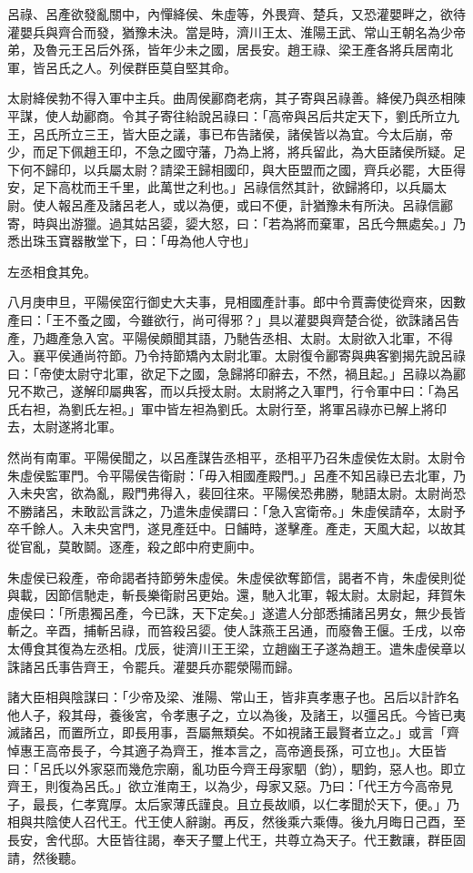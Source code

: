 \begin{pinyinscope}
呂祿、呂產欲發亂關中，內憚絳侯、朱虛等，外畏齊、楚兵，又恐灌嬰畔之，欲待灌嬰兵與齊合而發，猶豫未決。當是時，濟川王太、淮陽王武、常山王朝名為少帝弟，及魯元王呂后外孫，皆年少未之國，居長安。趙王祿、梁王產各將兵居南北軍，皆呂氏之人。列侯群臣莫自堅其命。

太尉絳侯勃不得入軍中主兵。曲周侯酈商老病，其子寄與呂祿善。絳侯乃與丞相陳平謀，使人劫酈商。令其子寄往紿說呂祿曰：「高帝與呂后共定天下，劉氏所立九王，呂氏所立三王，皆大臣之議，事已布告諸侯，諸侯皆以為宜。今太后崩，帝少，而足下佩趙王印，不急之國守藩，乃為上將，將兵留此，為大臣諸侯所疑。足下何不歸印，以兵屬太尉？請梁王歸相國印，與大臣盟而之國，齊兵必罷，大臣得安，足下高枕而王千里，此萬世之利也。」呂祿信然其計，欲歸將印，以兵屬太尉。使人報呂產及諸呂老人，或以為便，或曰不便，計猶豫未有所決。呂祿信酈寄，時與出游獵。過其姑呂媭，媭大怒，曰：「若為將而棄軍，呂氏今無處矣。」乃悉出珠玉寶器散堂下，曰：「毋為他人守也」

左丞相食其免。

八月庚申旦，平陽侯窋行御史大夫事，見相國產計事。郎中令賈壽使從齊來，因數產曰：「王不蚤之國，今雖欲行，尚可得邪？」具以灌嬰與齊楚合從，欲誅諸呂告產，乃趣產急入宮。平陽侯頗聞其語，乃馳告丞相、太尉。太尉欲入北軍，不得入。襄平侯通尚符節。乃令持節矯內太尉北軍。太尉復令酈寄與典客劉揭先說呂祿曰：「帝使太尉守北軍，欲足下之國，急歸將印辭去，不然，禍且起。」呂祿以為酈兄不欺己，遂解印屬典客，而以兵授太尉。太尉將之入軍門，行令軍中曰：「為呂氏右袒，為劉氏左袒。」軍中皆左袒為劉氏。太尉行至，將軍呂祿亦已解上將印去，太尉遂將北軍。

然尚有南軍。平陽侯聞之，以呂產謀告丞相平，丞相平乃召朱虛侯佐太尉。太尉令朱虛侯監軍門。令平陽侯告衛尉：「毋入相國產殿門。」呂產不知呂祿已去北軍，乃入未央宮，欲為亂，殿門弗得入，裴回往來。平陽侯恐弗勝，馳語太尉。太尉尚恐不勝諸呂，未敢訟言誅之，乃遣朱虛侯謂曰：「急入宮衛帝。」朱虛侯請卒，太尉予卒千餘人。入未央宮門，遂見產廷中。日餔時，遂擊產。產走，天風大起，以故其從官亂，莫敢鬬。逐產，殺之郎中府吏廁中。

朱虛侯已殺產，帝命謁者持節勞朱虛侯。朱虛侯欲奪節信，謁者不肯，朱虛侯則從與載，因節信馳走，斬長樂衛尉呂更始。還，馳入北軍，報太尉。太尉起，拜賀朱虛侯曰：「所患獨呂產，今已誅，天下定矣。」遂遣人分部悉捕諸呂男女，無少長皆斬之。辛酉，捕斬呂祿，而笞殺呂媭。使人誅燕王呂通，而廢魯王偃。壬戌，以帝太傅食其復為左丞相。戊辰，徙濟川王王梁，立趙幽王子遂為趙王。遣朱虛侯章以誅諸呂氏事告齊王，令罷兵。灌嬰兵亦罷滎陽而歸。

諸大臣相與陰謀曰：「少帝及梁、淮陽、常山王，皆非真孝惠子也。呂后以計詐名他人子，殺其母，養後宮，令孝惠子之，立以為後，及諸王，以彊呂氏。今皆已夷滅諸呂，而置所立，即長用事，吾屬無類矣。不如視諸王最賢者立之。」或言「齊悼惠王高帝長子，今其適子為齊王，推本言之，高帝適長孫，可立也」。大臣皆曰：「呂氏以外家惡而幾危宗廟，亂功臣今齊王母家駟（鈞），駟鈞，惡人也。即立齊王，則復為呂氏。」欲立淮南王，以為少，母家又惡。乃曰：「代王方今高帝見子，最長，仁孝寬厚。太后家薄氏謹良。且立長故順，以仁孝聞於天下，便。」乃相與共陰使人召代王。代王使人辭謝。再反，然後乘六乘傳。後九月晦日己酉，至長安，舍代邸。大臣皆往謁，奉天子璽上代王，共尊立為天子。代王數讓，群臣固請，然後聽。


\end{pinyinscope}
